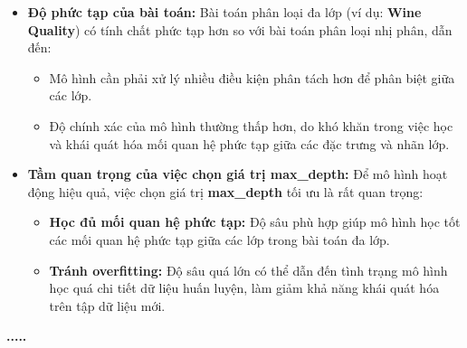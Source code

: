 \begin{itemize}
	\item \textbf{Độ phức tạp của bài toán:}  
	Bài toán phân loại đa lớp (ví dụ: \textbf{Wine Quality}) có tính chất phức tạp hơn so với bài toán phân loại nhị phân, dẫn đến:
	\begin{itemize}
		\item Mô hình cần phải xử lý nhiều điều kiện phân tách hơn để phân biệt giữa các lớp.
		\item Độ chính xác của mô hình thường thấp hơn, do khó khăn trong việc học và khái quát hóa mối quan hệ phức tạp giữa các đặc trưng và nhãn lớp.
	\end{itemize}
	
	\item \textbf{Tầm quan trọng của việc chọn giá trị max\_depth:}  
	Để mô hình hoạt động hiệu quả, việc chọn giá trị \textbf{max\_depth} tối ưu là rất quan trọng:
	\begin{itemize}
		\item \textbf{Học đủ mối quan hệ phức tạp:}  
		Độ sâu phù hợp giúp mô hình học tốt các mối quan hệ phức tạp giữa các lớp trong bài toán đa lớp.
		\item \textbf{Tránh overfitting:}  
		Độ sâu quá lớn có thể dẫn đến tình trạng mô hình học quá chi tiết dữ liệu huấn luyện, làm giảm khả năng khái quát hóa trên tập dữ liệu mới.
	\end{itemize}
	
\end{itemize}


\textbf{.....}